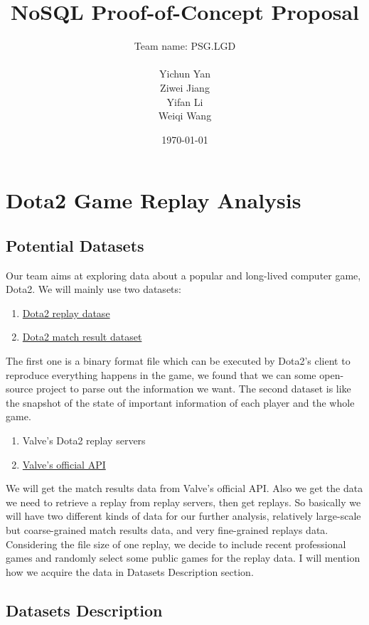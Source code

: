 \documentclass{article}
\title{NoSQL Proof-of-Concept Proposal}
\author{
	Team name: PSG.LGD \\ \\
	Yichun Yan \\
	Ziwei Jiang \\
	Yifan Li \\
	Weiqi Wang
}
\date{\today}
\begin{document}
\maketitle

\tableofcontents
\clearpage


\section{Dota2 Game Replay Analysis}
\subsection{Potential Datasets}
Our team aims at exploring data about a popular and long-lived computer game, Dota2. We will mainly use two datasets:
\begin{enumerate}
\item \href{https://wiki.teamfortress.com/wiki/Replay}{Dota2 replay datase}
\item \href{https://wiki.teamfortress.com/wiki/WebAPI/GetMatchDetails}{Dota2 match result dataset}
\end{enumerate}
The first one is a binary format file which can be executed by Dota2's client to reproduce everything happens in the game, we found that we can some open-source project to parse out the information we want. The second dataset is like the snapshot of the state of important information of each player and the whole game.

\begin{enumerate}
\item Valve's Dota2 replay servers
\item \href{https://wiki.teamfortress.com/wiki/WebAPI}{Valve's official API}
\end{enumerate}

We will get the match results data from Valve's official API. Also we get the data we need to retrieve a replay from replay servers, then get replays. So basically we will have two different kinds of data for our further analysis, relatively large-scale but coarse-grained match results data, and very fine-grained replays data. Considering the file size of one replay, we decide to  include recent professional games and randomly select some public games for the replay data. I will mention how we acquire the data in Datasets Description section.


\subsection{Datasets Description}
\end{document}
